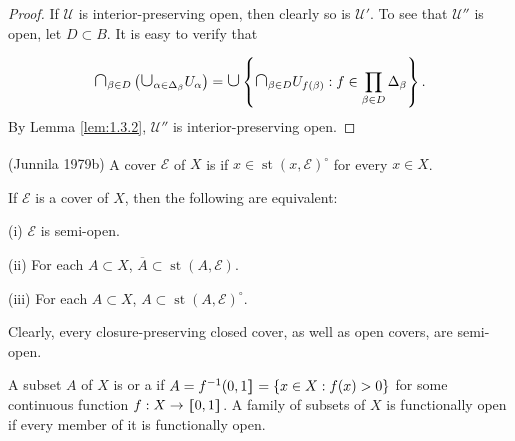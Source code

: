 \documentclass[prelim.tex]{subfiles}
\begin{document}
\begin{proof} 
If $\mathscr{U}$ is interior-preserving open, then clearly so is  $\mathscr{U}'$.
To see that $\mathscr{U}''$ is open, let $D \subset B$. It is easy to verify that

$$\scalebox{1.4}{$\cap$}_{\beta \in D} \left(\scalebox{1.4}{$\cup$}_{\alpha \in \Delta_\beta} 
U_\alpha \right) 
= \scalebox{1.4}{$\cup$} \left\{ \scalebox{1.4}{$\cap$}_{\beta \in D} U_{f(\beta)}: 
f \in \prod_{\beta \in D} \Delta_\beta \right\}.$$
By Lemma \ref{lem:1.3.2}, $\mathscr{U}''$ is interior-preserving open.
\end{proof} 

{ \label{def:1.3.4}
\textup{(\hstretch{1.8}{[}Junnila 1979b\hstretch{1.8}{]}\textsuperscript{\cite{Junnila1979b}})} 
A cover $\mathscr{E}$ of $X$ is 
if $x \in  \operatorname{st}(x, \mathscr{E})^\circ$ for every $x \in X$.

} %

{\lemma{} \label{lem:1.3.5}
If $\mathscr{E}$ is a cover of $X$, then the following are equivalent:

\textup{(i)}  $\mathscr{E}$ is semi-open.

\textup{(ii)} For each $A \subset X$, 
$\overline{A} \subset \operatorname{st}(A, \mathscr{E})$.

\textup{(iii)} For each $A \subset X$, $A \subset  \operatorname{st}(A, \mathscr{E})^\circ$.
\hfill \qedsymbol
}

\vspace{8pt}
Clearly, every closure-preserving closed cover, as well as open covers, are semi-open.


{ \label{def:1.3.6}
A subset $A$ of $X$ is 
or a 
if $A = f^{-1}(0, 1\hstretch{1.8}{]} = \{x \in X: f(x) > 0\}$ for some continuous function 
$f: X \rightarrow \hstretch{1.8}{[}0, 1\hstretch{1.8}{]}$.
A family of subsets of $X$ is functionally open if every member of it is functionally open.
}%
\end{document}
